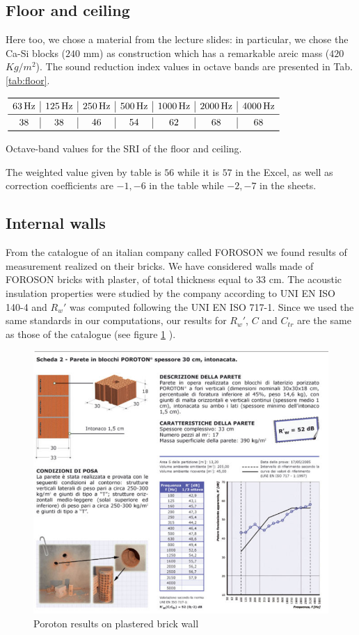 \documentclass[]{scrartcl}
\begin{document}
\subsection{Floor and ceiling}
Here too, we chose a material from the lecture slides: in particular, we chose the Ca-Si blocks ($240$ mm) as construction which has a remarkable areic mass ($420$ $Kg/m^2$). The sound reduction index values in octave bands are presented in Tab. \ref{tab:floor}.
\begin{table}[h]
	\centering
	$\begin{array}{c|c|c|c|c|c|c}
		\toprule
		\SI{63}{\hertz} & \SI{125}{\hertz} & \SI{250}{\hertz}  & \SI{500}{\hertz}  & \SI{1000}{\hertz}  & \SI{2000}{\hertz} & \SI{4000}{\hertz} \\
		\midrule
		38 & 38 & 46 & 54 & 62 & 68 & 68 \\
		\bottomrule
	\end{array}$
	\caption{Octave-band values for the SRI of the floor and ceiling.}
	\label{tab:floor}
\end{table}

The weighted value given by table is $56$ while it is $57$ in the Excel, as well as correction coefficients are $-1,-6$ in the table while $-2,-7$ in the sheets. 

\subsection{Internal walls}
From the catalogue of an italian company called FOROSON we found results of measurement realized on their bricks. We have considered walls made of FOROSON bricks with plaster, of total thickness equal to $33$ cm. The acoustic insulation properties were studied by the company according to UNI EN ISO 140-4 and $R_w'$ was computed following the UNI EN ISO 717-1. Since we used the same standards in our computations, our results for $R_w'$, $C$ and $C_{tr}$ are the same as those of the catalogue (see figure \ref{fig:poroton} ).
\begin{figure}[h]
	\centering
	\includegraphics[width=0.9\linewidth]{poroton}
	\caption{Poroton results on plastered brick wall}
	\label{fig:poroton}
\end{figure}
\end{document}

